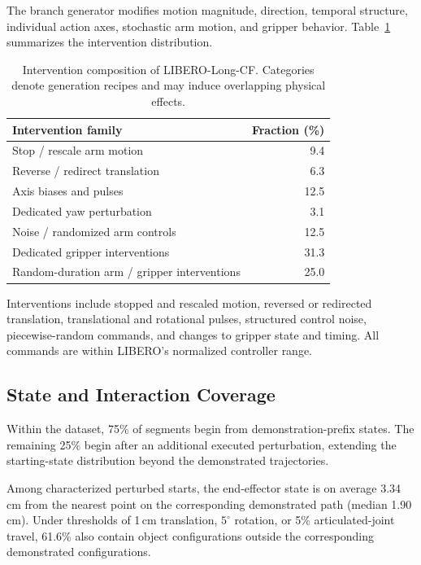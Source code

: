 The branch generator modifies motion magnitude, direction, temporal structure,
individual action axes, stochastic arm motion, and gripper behavior.
Table~\ref{tab:libero-cf-composition} summarizes the intervention distribution.

\begin{table}[t]
    \centering
    \caption{
    Intervention composition of LIBERO-Long-CF. Categories denote generation
    recipes and may induce overlapping physical effects.
    }
    \label{tab:libero-cf-composition}
    \small
    \begin{tabular}{@{}lr@{}}
        \toprule
        \textbf{Intervention family}
        & \textbf{Fraction (\%)} \\
        \midrule
        Stop / rescale arm motion
        & 9.4 \\
        Reverse / redirect translation
        & 6.3 \\
        Axis biases and pulses
        & 12.5 \\
        Dedicated yaw perturbation
        & 3.1 \\
        Noise / randomized arm controls
        & 12.5 \\
        Dedicated gripper interventions
        & 31.3 \\
        Random-duration arm / gripper interventions
        & 25.0 \\
        \bottomrule
    \end{tabular}
\end{table}

Interventions include stopped and rescaled motion, reversed or redirected
translation, translational and rotational pulses, structured control noise,
piecewise-random commands, and changes to gripper state and timing. All
commands are within LIBERO's normalized controller range.

\subsection{State and Interaction Coverage}
\label{app:libero-cf-coverage}

Within the dataset, 75\% of segments begin from demonstration-prefix states.
The remaining 25\% begin after an additional executed perturbation, extending
the starting-state distribution beyond the demonstrated trajectories.

Among characterized perturbed starts, the end-effector state is on average
3.34\,cm from the nearest point on the corresponding demonstrated path
(median 1.90\,cm). Under thresholds of 1\,cm translation, $5^\circ$ rotation,
or 5\% articulated-joint travel, 61.6\% also contain object configurations
outside the corresponding demonstrated configurations.

